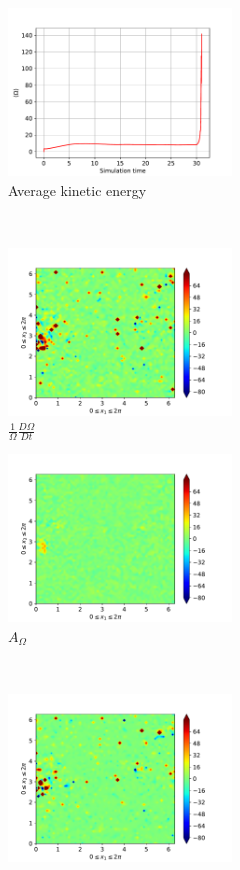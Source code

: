 \begin{figure}[H]
    \begin{subfigure}[H]{0.45\textwidth}
        \includegraphics[height=1.75in]{media/run-cds-65/enst-average1480}
        \caption{Average kinetic energy}
    \end{subfigure}
    ~
    \begin{subfigure}[H]{0.45\textwidth}
        \includegraphics[height=1.75in]{media/run-cds-65/enst-1480}
        \caption{$\frac{1}{\Omega} \frac{D \Omega}{Dt}$}
    \end{subfigure}
    \newline
    \begin{subfigure}{0.45\textwidth}
        \includegraphics[height=1.75in]{media/run-cds-65/A-enst-1480}
        \caption{$A_{\Omega}$}
    \end{subfigure}
    ~
    \begin{subfigure}{0.45\textwidth}
        \includegraphics[height=1.75in]{media/run-cds-65/Pi-enst-1480}

\end{subfigure}
\end{figure}

